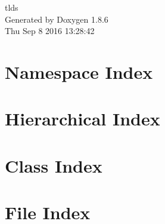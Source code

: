 \documentclass[twoside]{book}
\newcommand{\clearemptydoublepage}{%
  \newpage{\pagestyle{empty}\cleardoublepage}%
}
\begin{document}
\hypersetup{pageanchor=false}
\begin{titlepage}
\vspace*{7cm}
\begin{center}%
{\Large tlds }\\
\vspace*{1cm}
{\large Generated by Doxygen 1.8.6}\\
\vspace*{0.5cm}
{\small Thu Sep 8 2016 13:28:42}\\
\end{center}
\end{titlepage}
\clearemptydoublepage
\tableofcontents
\clearemptydoublepage
{}
\hypersetup{pageanchor=true}

\chapter{Namespace Index}

\chapter{Hierarchical Index}

\chapter{Class Index}

\chapter{File Index}

\end{document}
